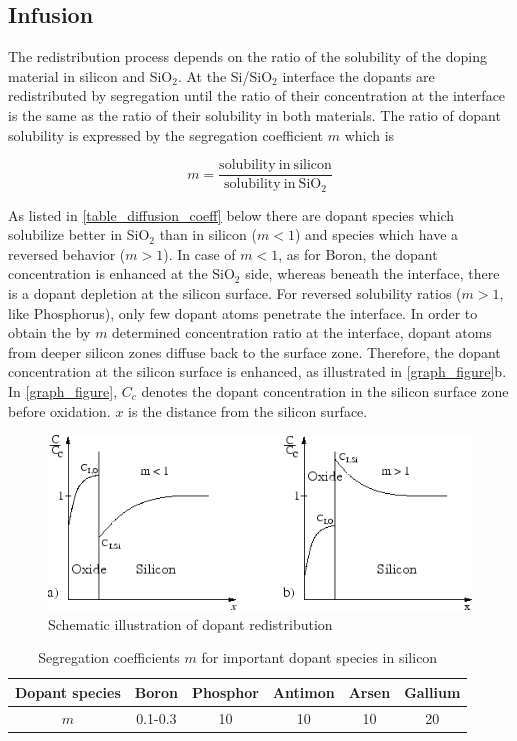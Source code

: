 \subsection{Infusion}
The redistribution process depends on the ratio of the solubility of the doping material in silicon and SiO$ _2$. At the Si/SiO$ _2$ interface the dopants are redistributed by segregation until the ratio of their concentration at the interface is the same as the ratio of their solubility in both materials. The ratio of dopant solubility is expressed by the segregation coefficient $m$ which is

\begin{equation}
\displaystyle m = \frac{
	\mathrm{solubility\ in\ silicon}
	}{
	\mathrm{solubility\ in\ SiO_2}
	}
\end{equation}

As listed in \autoref{table_diffusion_coeff} below there are dopant species which solubilize better in SiO$ _2$ than in silicon ($ m < 1$) and species which have a reversed behavior ($ m > 1$).
In case of $ m < 1$, as for Boron, the dopant concentration is enhanced at the SiO$ _2$ side, whereas beneath the interface, there is a dopant depletion at the silicon surface.
For reversed solubility ratios ($ m > 1$, like Phosphorus), only few dopant atoms penetrate the interface.
In order to obtain the by $ m$ determined concentration ratio at the interface, dopant atoms from deeper silicon zones diffuse back to the surface zone.
Therefore, the dopant concentration at the silicon surface is enhanced, as illustrated in \autoref{graph_figure}b.
In \autoref{graph_figure}, $ C_c$ denotes the dopant concentration in the silicon surface zone before oxidation. $ x$ is the distance from the silicon surface.

\begin{figure}[H]
	\centering
	\includegraphics[width=0.75\linewidth]{infusion_penetration.png}
	\caption{Schematic illustration of dopant redistribution}
	\label{graph_figure}
\end{figure}
\begin{table}[H]
	\centering
	\begin{tabular}{|c|c|c|c|c|c|}
		\hline
		Dopant species &
		Boron &
		Phosphor &
		Antimon &
		Arsen &
		Gallium \\
		\hline
		$m$ &
		0.1-0.3 &
		10 &
		10 &
		10 &
		20 \\
		\hline
	\end{tabular}
	\caption{Segregation coefficients $m$ for important dopant species in silicon}
	\label{table_diffusion_coeff}
\end{table}
